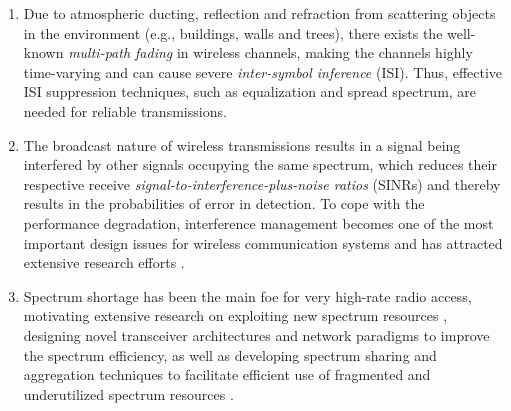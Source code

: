 \documentclass[journal]{IEEEtran}
\begin{document}
\begin{enumerate}
\item Due to  atmospheric ducting, reflection and refraction from scattering objects in the environment (e.g., buildings, walls and trees), there exists  the well-known \emph{multi-path fading} in wireless channels,  making the channels  highly time-varying and can cause severe  \emph{inter-symbol inference} (ISI). Thus, effective ISI suppression techniques, such as equalization and spread spectrum, are needed for reliable transmissions.

\item The broadcast nature of wireless transmissions results in a signal being interfered by other signals occupying the same spectrum, which reduces  their  respective receive \emph{signal-to-interference-plus-noise ratios} (SINRs) and thereby results in  the probabilities  of error in detection. To cope with the performance degradation,  interference management becomes one of the most important  design issues for  wireless communication systems and has attracted extensive research efforts \cite{GesbertMCMIMO1209,JafarTIT1401,CLiTCOM1504}.

\item Spectrum shortage has been the main foe for very high-rate radio access, motivating extensive research on exploiting new spectrum resources  \cite{TorkildsonTWC1112,XYuJSTSP1604}, designing novel transceiver architectures \cite{Alamouti9810,AGoldsmith0306,Larsson1402} and network paradigms \cite{Andrews1203,Dhillon1203} to improve the spectrum efficiency, as well as developing spectrum sharing and aggregation techniques to facilitate efficient use of fragmented and underutilized spectrum resources \cite{SHan1605,QChen1610,Kryszkiewicz1610}.
\end{enumerate}
\end{document}
